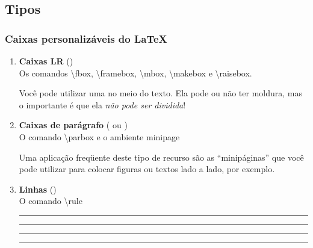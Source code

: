 \documentclass[handout,10pt]{beamer}
\begin{document}
{
\renewcommand{\cs}[1]{{\ttfamily\textbackslash\textcolor{blue!50}{#1}}}
\renewcommand{\ambiente}[1]{{\ttfamily\textcolor{green!50}{#1}}}

\subsection{Tipos}
\begin{frame}[fragile]
	\frametitle{Caixas personalizáveis do \LaTeX}
		
	\begin{enumerate}
	
		\item<2-> \textbf{Caixas LR}
			()\\[-0.25\baselineskip]			
			{\scriptsize\color{gray!50}Os comandos \cs{fbox}, \cs{framebox},
			\cs{mbox}, \cs{makebox} e \cs{raisebox}.}
		
			\medskip
		
			\begin{center}\scriptsize
				\parbox{0.7\textwidth}{Você pode utilizar uma  no meio
				do texto. Ela pode ou não ter moldura, mas o importante é que ela
				\emph{não pode ser dividida}!}
			\end{center}
		
			\vfill
		
		\item<3-> \textbf{Caixas de parágrafo}
			( ou )\\[-0.25\baselineskip]
			{\scriptsize\color{gray!50} O comando \cs{parbox} e o ambiente
			\ambiente{minipage}}
		
			\medskip
		
			\hfill
				\parbox[c]{0.45\textwidth}{\scriptsize Uma aplicação freqüente deste
				tipo de recurso são as ``minipáginas\rlap{,}'' que você pode utilizar
				para colocar figuras ou textos lado a lado, por exemplo.}
		
			\vfill
		
		\item<4-> \textbf{Linhas}
			()\\[-0.25\baselineskip]
			{\scriptsize\color{gray!50} O comando \cs{rule}}
		
			\medskip
		
			\parbox{0.2\textwidth}{\rule{20pt}{20pt}}\hfill
			\parbox{0.2\textwidth}{\rule{30pt}{10pt}}\hfill
			\parbox{0.2\textwidth}{\rule{40pt}{1pt}}\hfill
			\parbox{0.2\textwidth}{\rule{50pt}{0.1pt}}		
	\end{enumerate}
\end{frame}
}
\end{document}
